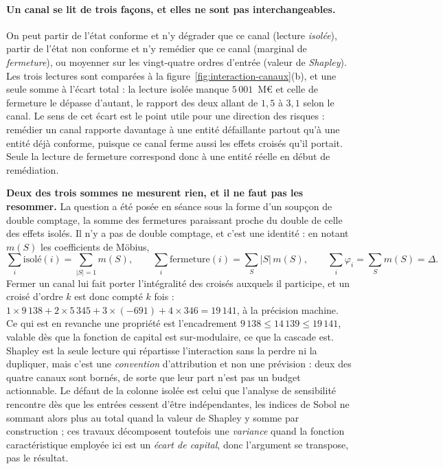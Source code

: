 \paragraph{Un canal se lit de trois façons, et elles ne sont pas interchangeables.} On peut partir
de l'état conforme et n'y dégrader que ce canal (lecture \emph{isolée}), partir de l'état non
conforme et n'y remédier que ce canal (marginal de \emph{fermeture}), ou moyenner sur les
vingt-quatre ordres d'entrée (valeur de \emph{Shapley}). Les trois lectures sont comparées à la
figure~\ref{fig:interaction-canaux}(b), et une seule somme à l'écart total : la lecture isolée manque
$5\,001$~M\euro{} et celle de fermeture le dépasse d'autant, le rapport des deux allant de
$1{,}5$ à $3{,}1$ selon le canal. Le sens de cet écart est le point utile pour une direction des
risques : remédier un canal rapporte davantage à une entité défaillante partout qu'à une entité
déjà conforme, puisque ce canal ferme aussi les effets croisés qu'il portait. Seule la lecture de
fermeture correspond donc à une entité réelle en début de remédiation.

\begin{attention}
\textbf{Deux des trois sommes ne mesurent rien, et il ne faut pas les resommer.} La question a été
posée en séance sous la forme d'un soupçon de double comptage, la somme des fermetures paraissant
proche du double de celle des effets isolés. Il n'y a pas de double comptage, et c'est une
identité : en notant $m(S)$ les coefficients de Möbius,
\[
  \sum_i \text{isolé}(i) = \!\!\sum_{|S|=1}\!\! m(S), \qquad
  \sum_i \text{fermeture}(i) = \sum_S |S|\,m(S), \qquad
  \sum_i \varphi_i = \sum_S m(S) = \Delta .
\]
Fermer un canal lui fait porter l'intégralité des croisés auxquels il participe, et un croisé
d'ordre $k$ est donc compté $k$ fois :
$1\times 9\,138 + 2\times 5\,345 + 3\times(-691) + 4\times 346 = 19\,141$, à la précision machine.
Ce qui est en revanche une propriété est l'encadrement $9\,138 \leq 14\,139 \leq 19\,141$, valable
dès que la fonction de capital est sur-modulaire, ce que la cascade est. Shapley est la seule
lecture qui répartisse l'interaction sans la perdre ni la dupliquer, mais c'est une
\emph{convention} d'attribution et non une prévision : deux des quatre canaux sont bornés, de
sorte que leur part n'est pas un budget actionnable. Le défaut de la colonne isolée est celui que
l'analyse de sensibilité rencontre dès que les entrées cessent d'être indépendantes, les indices
de Sobol ne sommant alors plus au total quand la valeur de Shapley y somme par construction
\citep{Owen2014, IoossPrieur2019} ; ces travaux décomposent toutefois une \emph{variance} quand la
fonction caractéristique employée ici est un \emph{écart de capital}, donc l'argument se transpose,
pas le résultat.
\end{attention}

